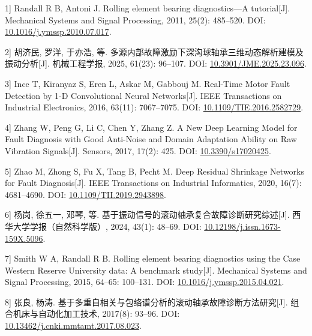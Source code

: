 \documentclass[UTF8,12pt,openany,twoside]{ctexbook}
\numberwithin{equation}{chapter}
\begin{document}
\noindent\begingroup\samepage {[}1{]} Randall R B, Antoni J. Rolling element bearing diagnostics---A tutorial[J]. Mechanical Systems and Signal Processing, 2011, 25(2): 485--520. DOI: \url{10.1016/j.ymssp.2010.07.017}.\par\endgroup

\noindent\begingroup\samepage {[}2{]} 胡济民, 罗洋, 于亦浩, 等. 多源内部故障激励下深沟球轴承三维动态解析建模及振动分析[J]. 机械工程学报, 2025, 61(23): 96--107. DOI: \url{10.3901/JME.2025.23.096}.\par\endgroup

\noindent\begingroup\samepage {[}3{]} Ince T, Kiranyaz S, Eren L, Askar M, Gabbouj M. Real-Time Motor Fault Detection by 1-D Convolutional Neural Networks[J]. IEEE Transactions on Industrial Electronics, 2016, 63(11): 7067--7075. DOI: \url{10.1109/TIE.2016.2582729}.\par\endgroup

\noindent\begingroup\samepage {[}4{]} Zhang W, Peng G, Li C, Chen Y, Zhang Z. A New Deep Learning Model for Fault Diagnosis with Good Anti-Noise and Domain Adaptation Ability on Raw Vibration Signals[J]. Sensors, 2017, 17(2): 425. DOI: \url{10.3390/s17020425}.\par\endgroup

\noindent\begingroup\samepage {[}5{]} Zhao M, Zhong S, Fu X, Tang B, Pecht M. Deep Residual Shrinkage Networks for Fault Diagnosis[J]. IEEE Transactions on Industrial Informatics, 2020, 16(7): 4681--4690. DOI: \url{10.1109/TII.2019.2943898}.\par\endgroup

\noindent\begingroup\samepage {[}6{]} 杨岗, 徐五一, 邓琴, 等. 基于振动信号的滚动轴承复合故障诊断研究综述[J]. 西华大学学报（自然科学版）, 2024, 43(1): 48--69. DOI: \url{10.12198/j.issn.1673-159X.5096}.\par\endgroup

\noindent\begingroup\samepage {[}7{]} Smith W A, Randall R B. Rolling element bearing diagnostics using the Case Western Reserve University data: A benchmark study[J]. Mechanical Systems and Signal Processing, 2015, 64--65: 100--131. DOI: \url{10.1016/j.ymssp.2015.04.021}.\par\endgroup

\noindent\begingroup\samepage {[}8{]} 张良, 杨涛. 基于多重自相关与包络谱分析的滚动轴承故障诊断方法研究[J]. 组合机床与自动化加工技术, 2017(8): 93--96. DOI: \url{10.13462/j.cnki.mmtamt.2017.08.023}.\par\endgroup
\end{document}
